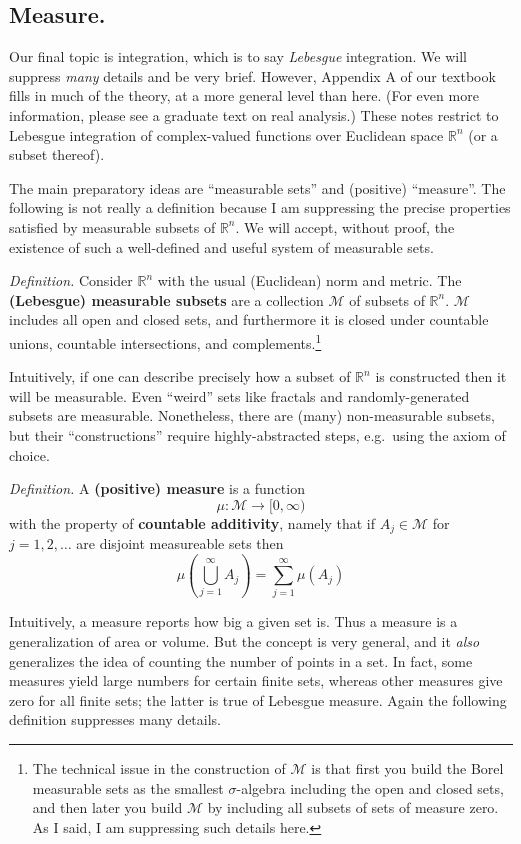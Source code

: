 \documentclass[12pt]{article}
\newcommand{\cM}{\mathcal{M}}
\newcommand{\RR}{\mathbb{R}}
\newcommand{\sect}[1]{\subsection*{#1.}}
\newcommand{\defin}{\emph{Definition.}\,\,}
\begin{document}
\sect{Measure}

Our final topic is integration, which is to say \emph{Lebesgue} integration.  We will suppress \emph{many} details and be very brief.  However, Appendix A of our textbook fills in much of the theory, at a more general level than here.  (For even more information, please see a graduate text on real analysis.)  These notes restrict to Lebesgue integration of complex-valued functions over Euclidean space $\RR^n$ (or a subset thereof).

The main preparatory ideas are ``measurable sets'' and (positive) ``measure''.  The following is not really a definition because I am suppressing the precise properties satisfied by measurable subsets of $\RR^n$.  We will accept, without proof, the existence of such a well-defined and useful system of measurable sets.

\defin Consider $\RR^n$ with the usual (Euclidean) norm and metric.  The \textbf{(Lebesgue) measurable subsets} are a collection $\cM$ of subsets of $\RR^n$.  $\cM$ includes all open and closed sets, and furthermore it is closed under countable unions, countable intersections, and complements.\footnote{The technical issue in the construction of $\cM$ is that first you build the Borel measurable sets as the smallest $\sigma$-algebra including the open and closed sets, and then later you build $\cM$ by including all subsets of sets of measure zero.  As I said, I am suppressing such details here.}

Intuitively, if one can describe precisely how a subset of $\RR^n$ is constructed then it will be measurable.  Even ``weird'' sets like fractals and randomly-generated subsets are measurable.  Nonetheless, there are (many) non-measurable subsets, but their ``constructions'' require highly-abstracted steps, e.g.~using the axiom of choice.

\defin A \textbf{(positive) measure} is a function
	$$\mu : \cM \to [0,\infty)$$
with the property of \textbf{countable additivity}, namely that if $A_j \in \cM$ for $j=1,2,\dots$ are disjoint measureable sets then
	$$\mu\left(\bigcup_{j=1}^\infty A_j\right) = \sum_{j=1}^\infty \mu(A_j)$$

Intuitively, a measure reports how big a given set is.  Thus a measure is a generalization of area or volume.  But the concept is very general, and it \emph{also} generalizes the idea of counting the number of points in a set.  In fact, some measures yield large numbers for certain finite sets, whereas other measures give zero for all finite sets; the latter is true of Lebesgue measure.  Again the following definition suppresses many details.
\end{document}
